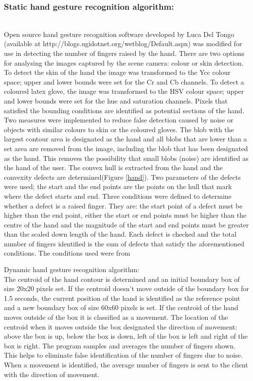 \documentclass[jou,a4paper,notxfonts]{apa}
\begin{document}
\subsubsection{Static hand gesture recognition algorithm:}\hspace{0pt} \\
Open source hand gesture recognition software developed by Luca Del Tongo (available at http://blogs.ugidotnet.org/wetblog/Default.aspx) was modified for use in detecting the number of fingers raised by the hand. There are two options for analysing the images captured by the scene camera: colour or skin detection. To detect the skin of the hand the image was transformed to the Ycc colour space; upper and lower bounds were set for the Cr and Cb channels. To detect a coloured latex glove, the image was transformed to the HSV colour space; upper and lower bounds were set for the hue and saturation channels. Pixels that satisfied the bounding conditions are identified as potential sections of the hand. Two measures were implemented to reduce false detection caused by noise or objects with similar colours to skin or the coloured gloves. The blob with the largest contour area is designated as the hand and all blobs that are lower than a set area are removed from the image, including the blob that has been designated as the hand. This removes the possibility that small blobs (noise) are identified as the hand of the user. The convex hull is extracted from the hand and the convexity defects are determined(Figure \ref{hand}). Two parameters of the defects were used; the start and the end points are the points on the hull that mark where the defect starts and end. Three conditions were defined to determine whether a defect is a raised finger. They are: the start point of a defect must be higher than the end point, either the start or end points must be higher than the centre of the hand and the magnitude of the start and end points must be greater than the scaled down length of the hand. Each defect is checked and the total number of fingers identified is the sum of defects that satisfy the aforementioned conditions. The conditions used were from 


Dynamic hand gesture recognition algorithm:\\
The centroid of the hand contour is determined and an initial boundary box of size 20x20 pixels set. If the centroid doesn't move outside of the boundary box for 1.5 seconds, the current position of the hand is identified as the reference point and a new boundary box of size 60x60 pixels is set. If the centroid of the hand moves outside of the box it is classified as a movement. The location of the centroid when it moves outside the box designated the direction of movement: above the box is up, below the box is down, left of the box is left and right of the box is right. The program samples and averages the number of fingers shown. This helps to eliminate false identification of the number of fingers due to noise. When a movement is identified, the average number of fingers is sent to the client with the direction of movement.
\end{document}

